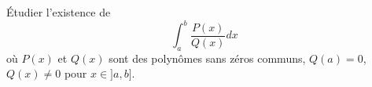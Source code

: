 

\begin{exercice}\label{exo_I-2-3}

Étudier l'existence de 
\begin{equation}
	\int_a^b\frac{ P(x) }{ Q(x) }dx
\end{equation}
où $P(x)$ et $Q(x)$ sont des polynômes sans zéros communs, $Q(a)=0$, $Q(x)\neq 0$ pour $x\in]a,b]$.

\end{exercice}
